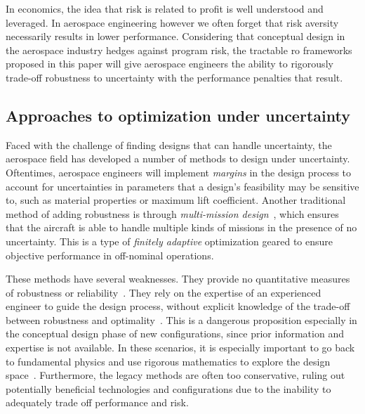 In economics, the idea that risk is related to profit is well understood and leveraged.
In aerospace engineering however we often forget that risk aversity necessarily results in lower performance.
Considering that conceptual design in the aerospace industry hedges against program risk,
the tractable \gls{ro} frameworks proposed in this paper will
give aerospace engineers the ability to rigorously trade-off robustness to uncertainty with the performance penalties
that result.

\subsection{Approaches to optimization under uncertainty}
\label{sec:approaches}

Faced with the challenge of finding designs that can handle uncertainty,
the aerospace field has developed a number of methods to
design under uncertainty. Oftentimes, aerospace engineers will implement
\emph{margins} in the design process to account for uncertainties in parameters that a design's feasibility
may be sensitive to, such as material properties or maximum lift coefficient.
Another traditional method of adding robustness is through \emph{multi-mission design}~\cite{York2018},
which ensures that the aircraft is able to handle
multiple kinds of missions in the presence of no uncertainty. This is a type of \emph{finitely
adaptive} optimization geared to ensure objective performance in off-nominal operations.

These methods have several weaknesses. They provide no quantitative measures of
robustness or reliability~\cite{Zang2002}. They rely on the expertise of an experienced
engineer to guide the design process, without explicit knowledge of the trade-off between
robustness and optimality~\cite{Yao2011}. This is a dangerous proposition especially in the
conceptual design phase of new configurations, since prior information and expertise is not
available. In these scenarios, it is especially important to go back to fundamental physics
and use rigorous mathematics to explore the design space~\cite{York2018}. Furthermore,
the legacy methods are often too conservative, ruling out potentially beneficial technologies
and configurations due to the inability to adequately trade off performance and risk.

